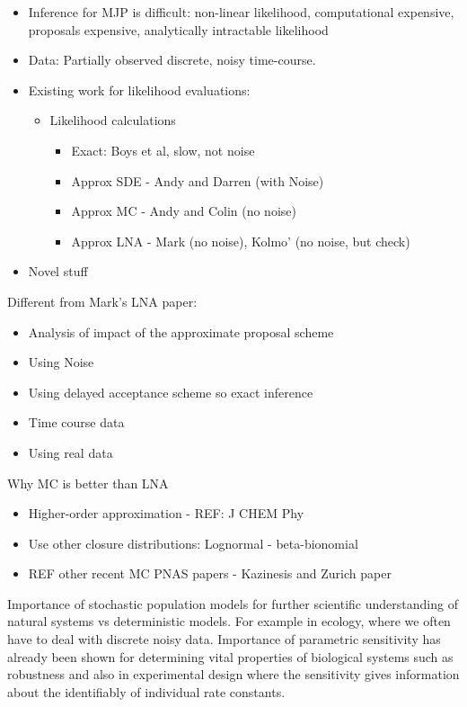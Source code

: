 \documentclass{pnastwo}
\begin{document}
\begin{article}
\begin{itemize}
\item Inference for MJP is difficult: non-linear likelihood, computational
  expensive, proposals expensive, analytically intractable likelihood
\item Data: Partially observed discrete, noisy time-course.
\item Existing work for likelihood evaluations: 
\begin{itemize}
\item Likelihood calculations
\begin{itemize}
\item Exact: Boys et al, slow, not noise
\item Approx SDE - Andy and Darren (with Noise)
\item Approx MC - Andy and Colin (no noise)
\item Approx LNA - Mark (no noise), Kolmo' (no noise, but check)
\end{itemize}
\end{itemize}
\item Novel stuff
\end{itemize}
Different from Mark's LNA paper:
\begin{itemize}
\item Analysis of impact of the approximate proposal scheme
\item Using Noise
\item Using delayed acceptance scheme so exact inference
\item Time course data
\item Using real data
\end{itemize}
Why MC is better than LNA
\begin{itemize}
\item Higher-order approximation - REF: J CHEM Phy
\item Use other closure distributions: Lognormal - beta-bionomial
\item REF other recent MC PNAS papers - Kazinesis and Zurich paper
\end{itemize}




Importance of stochastic population models for further scientific understanding of natural systems vs deterministic models.  For example in ecology, where we often have to deal with discrete noisy data.  Importance of parametric sensitivity has already been shown for determining vital properties of biological systems such as robustness and also in experimental design where the sensitivity gives information about the identifiably of individual rate constants.


\end{article}
\end{document}

